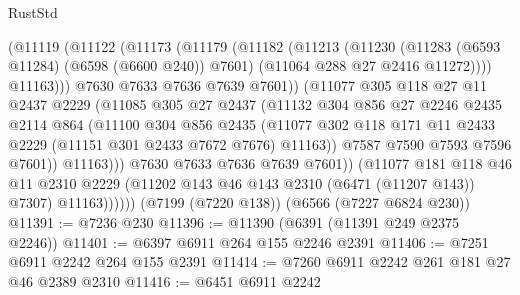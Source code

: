 \begin{lexlean}{RustStd}
\begin{coremodule}
{\begin{coremodule}
{{{{{{{{{{{{{{{{{{{{{{{{{{                        (@11119
                          (@11122
                            (@11173
                              (@11179
                                (@11182
                                  (@11213
                                    (@11230
                                      (@11283 (@6593 @11284) (@6598 (@6600 @240)) @7601)
                                      (@11064 @288 @27 @2416 @11272))))
                                @11163)))
                          @7630
                          @7633
                          @7636
                          @7639
                          @7601))
                      (@11077
                        @305
                        @118
                        @27
                        @11
                        @2437
                        @2229
                        (@11085
                          @305
                          @27
                          @2437
                          (@11132
                            @304
                            @856
                            @27
                            @2246
                            @2435
                            @2114
                            @864
                            (@11100
                              @304
                              @856
                              @2435
                              (@11077
                                @302
                                @118
                                @171
                                @11
                                @2433
                                @2229
                                (@11151 @301 @2433 @7672 @7676)
                                @11163))
                            @7587
                            @7590
                            @7593
                            @7596
                            @7601))
                        @11163)))
                  @7630
                  @7633
                  @7636
                  @7639
                  @7601))
              (@11077
                @181
                @118
                @46
                @11
                @2310
                @2229
                (@11202 @143 @46 @143 @2310 (@6471 (@11207 @143)) @7307)
                @11163))))))
    (@7199 (@7220 @138))
    (@6566 (@7227 @6824 @230))
@11391 := @7236 @230
@11396 := @11390 (@6391 (@11391 @249 @2375 @2246))
@11401 := @6397 @6911 @264 @155 @2246 @2391
@11406 := @7251 @6911 @2242 @264 @155 @2391
@11414 := @7260 @6911 @2242 @261 @181 @27 @46 @2389 @2310
@11416 := @6451 @6911 @2242
}}}}}}}}}}}}}}}}}}}}}}}}}}
\end{coremodule}}
\end{coremodule}
\end{lexlean}
